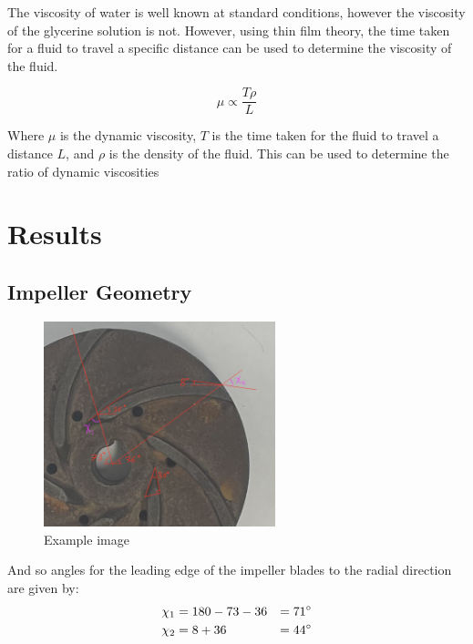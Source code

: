 \documentclass{article}
\begin{document}
The viscosity of water is well known at standard conditions, however the viscosity of the glycerine solution is not.
However, using thin film theory, the time taken for a fluid to travel a specific distance can be used to determine the viscosity of the fluid.

\begin{equation}
    \mu \propto \frac{T\rho}{L}
\end{equation}
    
Where $\mu$ is the dynamic viscosity, $T$ is the time taken for the fluid to travel a distance $L$, and $\rho$ is the density of the fluid.
This can be used to determine the ratio of dynamic viscosities
\section{Results}


\subsection{Impeller Geometry}

\begin{figure}[H]
    \centering
    \includegraphics[width=0.6\textwidth]{impeller_annotations.png}
    \caption{Example image}
    \label{fig:impeller_annotations}
\end{figure}

And so angles for the leading edge of the impeller blades to the radial direction are given by:
\begin{alignat}{2}
    \chi_1 &= 180-73-36 &= 71^\circ \notag \\
    \chi_2 &= 8 + 36 &= 44^\circ \notag
\end{alignat}
\end{document}

